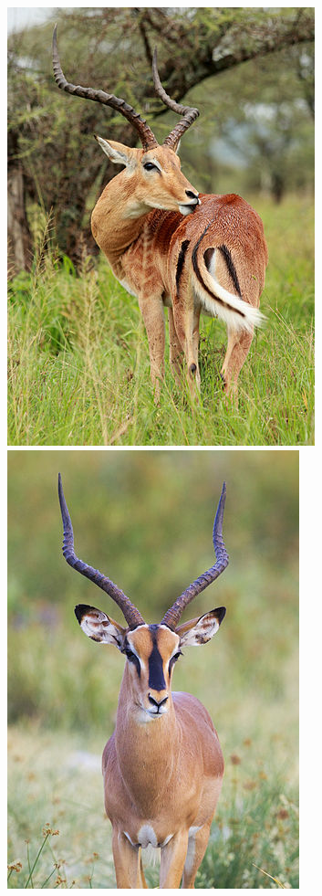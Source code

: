 \documentclass[12pt]{article}
\begin{document}
\begin{figure}
\begin{center}
\includegraphics[height=.2\textheight]{figures/common-impala.jpg}
\includegraphics[height=.2\textheight]{figures/black-faced-impala.jpg}

\end{center}
\end{figure}
\end{document}
